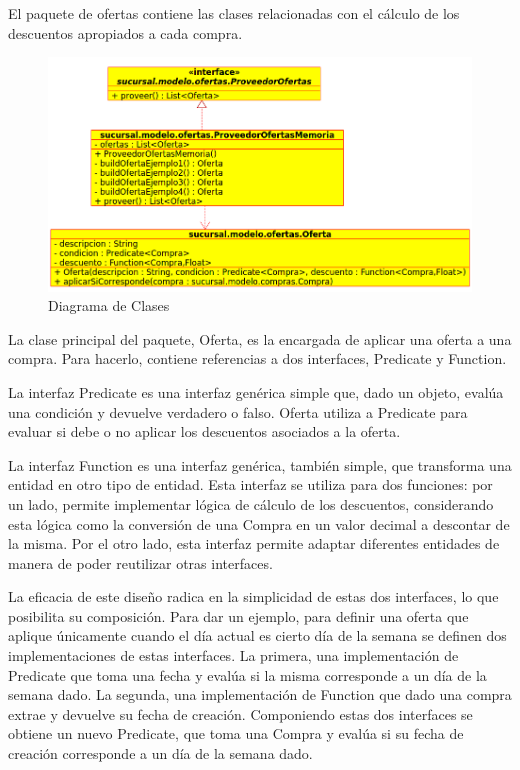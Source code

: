 \documentclass[a4paper,11pt]{article}
\begin{document}
El paquete de ofertas contiene las clases relacionadas con el cálculo de los
descuentos apropiados a cada compra.

\begin{figure}[!htp]
\begin{center}
\includegraphics[width=1\textwidth]{src/docs/ofertas.png}
\end{center}
\caption{Diagrama de Clases} \label{fig:oferta}
\end{figure}

\FloatBarrier

La clase principal del paquete, Oferta, es la encargada de aplicar una oferta a
una compra. Para hacerlo, contiene referencias a dos interfaces, Predicate y
Function.

La interfaz Predicate es una interfaz genérica simple que, dado un objeto,
evalúa una condición y devuelve verdadero o falso. Oferta utiliza a Predicate
para evaluar si debe o no aplicar los descuentos asociados a la oferta.

La interfaz Function es una interfaz genérica, también simple, que transforma
una entidad en otro tipo de entidad. Esta interfaz se utiliza para dos
funciones: por un lado, permite implementar lógica de cálculo de los
descuentos, considerando esta lógica como la conversión de una Compra en un valor
decimal a descontar de la misma. Por el otro lado, esta interfaz permite
adaptar diferentes entidades de manera de poder reutilizar otras interfaces.

La eficacia de este diseño radica en la simplicidad de estas dos interfaces, lo
que posibilita su composición. Para dar un ejemplo, para definir una oferta que
aplique únicamente cuando el día actual es cierto día de la semana se definen
dos implementaciones de estas interfaces. La primera, una implementación de
Predicate que toma una fecha y evalúa si la misma corresponde a un día de la
semana dado. La segunda, una implementación de Function que dado una compra
extrae y devuelve su fecha de creación. Componiendo estas dos interfaces se
obtiene un nuevo Predicate, que toma una Compra y evalúa si su fecha de
creación corresponde a un día de la semana dado.
\end{document}
